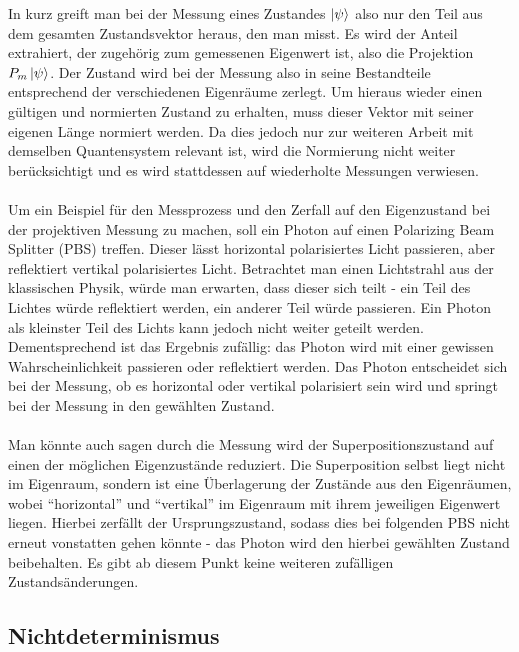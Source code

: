 In kurz greift man bei der Messung eines Zustandes $\ket\psi$ also nur den Teil aus dem gesamten Zustandsvektor heraus, den man misst. Es wird der Anteil extrahiert, der zugehörig zum gemessenen Eigenwert ist, also die Projektion $P_m \ket\psi$. Der Zustand wird bei der Messung also in seine Bestandteile entsprechend der verschiedenen Eigenräume zerlegt. Um hieraus wieder einen gültigen und normierten Zustand zu erhalten, muss dieser Vektor mit seiner eigenen Länge normiert werden. Da dies jedoch nur zur weiteren Arbeit mit demselben Quantensystem relevant ist, wird die Normierung nicht weiter berücksichtigt und es wird stattdessen auf wiederholte Messungen verwiesen.
\cite{kasirajan_fundamentals_2021} 
\\ \\
Um ein Beispiel für den Messprozess und den Zerfall auf den Eigenzustand bei der projektiven Messung zu machen, soll ein Photon auf einen Polarizing Beam Splitter (PBS) treffen. Dieser lässt horizontal polarisiertes Licht passieren, aber reflektiert vertikal polarisiertes Licht.
Betrachtet man einen Lichtstrahl aus der klassischen Physik, würde man erwarten, dass dieser sich teilt - ein Teil des Lichtes würde reflektiert werden, ein anderer Teil würde passieren. Ein Photon als kleinster Teil des Lichts kann jedoch nicht weiter geteilt werden.
Dementsprechend ist das Ergebnis zufällig: das Photon wird mit einer gewissen Wahrscheinlichkeit passieren oder reflektiert werden. Das Photon entscheidet sich bei der Messung, ob es horizontal oder vertikal polarisiert sein wird und springt bei der Messung in den gewählten Zustand. \\ \\
Man könnte auch sagen durch die Messung wird der Superpositionszustand auf einen der möglichen Eigenzustände reduziert. Die Superposition selbst liegt nicht im Eigenraum, sondern ist eine Überlagerung der Zustände aus den Eigenräumen, wobei ``horizontal'' und ``vertikal'' im Eigenraum mit ihrem jeweiligen Eigenwert liegen. Hierbei zerfällt der Ursprungszustand, sodass dies bei folgenden PBS nicht erneut vonstatten gehen könnte - das Photon wird den hierbei gewählten Zustand beibehalten.
Es gibt ab diesem Punkt keine weiteren zufälligen Zustandsänderungen. 
\cite{lvovsky_quantum_2018}

\subsection{Nichtdeterminismus}

